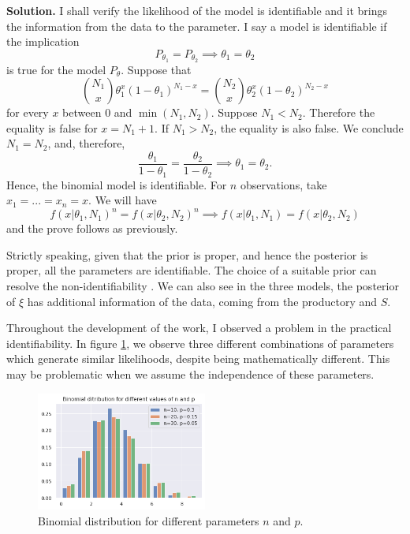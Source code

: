 \vspace{2ex}

    {\bf Solution.} I shall verify the likelihood of the model is identifiable
    and it brings the information from the data to the parameter. I say a
    model is identifiable if the implication 
    $$P_{\theta_1} = P_{\theta_2}
    \implies \theta_1 = \theta_2$$ 
    is true for the model $P_{\theta}$. Suppose that 
    $$
    \binom{N_1}{x} \theta_1^x(1 - \theta_1)^{N_1-x} = \binom{N_2}{x} \theta_2^x(1 - \theta_2)^{N_2-x} 
    $$
    for every $x$ between $0$ and $\min(N_1, N_2)$. Suppose $N_1 < N_2$.
    Therefore the equality is false for $x = N_1 + 1$. If $N_1 > N_2$, the
    equality is also false. We conclude $N_1 = N_2$, and, therefore, 
    $$
    \frac{\theta_1}{1- \theta_1} = \frac{\theta_2}{1- \theta_2}  \implies \theta_1 = \theta_2.   
    $$
    Hence, the binomial model is identifiable. For $n$ observations, take $x_1
    = ... = x_n = x$. We will have
    $$
    f(x|\theta_1, N_1)^n = f(x|\theta_2, N_2)^n \implies f(x|\theta_1, N_1) = f(x|\theta_2, N_2) 
    $$
    and the prove follows as previously. 

    \ind Strictly speaking, given that the prior is proper, and hence the posterior
    is proper, all the parameters are identifiable. The choice of a suitable
    prior can resolve the non-identifiability \cite{xie2006}. We can also see
    in the three models, the posterior of $\xi$ has additional information of
    the data, coming from the productory and $S$.

    \begin{remark}
        Throughout the development of the work, I observed a problem in the
        practical identifiability. In figure \ref{fig:binomial-distribution},
        we observe three different combinations of parameters which generate
        similar likelihoods, despite being mathematically different. This may
        be problematic when we assume the independence of these parameters.
    \end{remark}

\begin{figure}[!hb]
    \centering
    \includegraphics[width=0.5\textwidth]{../../images/binomial-distribution.png}
    \caption{Binomial distribution for different parameters $n$ and $p$.}
    \label{fig:binomial-distribution}
\end{figure}